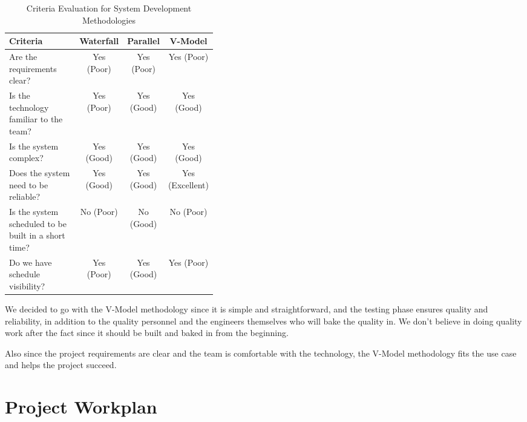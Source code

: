 \documentclass[a4paper]{report}
\begin{document}
\begin{table}[htbp]
    \centering
    \caption{Criteria Evaluation for System Development Methodologies}
    \label{tab:methodology-criteria}
    \begin{tabular}{@{}p{0.4\linewidth}ccc@{}}
        \toprule
        Criteria & Waterfall & Parallel & V-Model \\
        \midrule
        Are the requirements clear? & Yes (Poor) & Yes (Poor) & Yes (Poor) \\
        Is the technology familiar to the team? & Yes (Poor) & Yes (Good) & Yes (Good) \\
        Is the system complex? & Yes (Good) & Yes (Good) & Yes (Good) \\
        Does the system need to be reliable? & Yes (Good) & Yes (Good) & Yes (Excellent) \\
        Is the system scheduled to be built in a short time? & No (Poor) & No (Good) & No (Poor) \\
        Do we have schedule visibility? & Yes (Poor) & Yes (Good) & Yes (Poor) \\
        \bottomrule
    \end{tabular}
\end{table}

We decided to go with the V-Model methodology since it is simple and straightforward, and the testing phase ensures quality and reliability, in addition to the quality personnel and the engineers themselves who will bake the quality in. We don't believe in doing quality work after the fact since it should be built and baked in from the beginning.

Also since the project requirements are clear and the team is comfortable with the technology, the V-Model methodology fits the use case and helps the project succeed.

\chapter{Project Workplan}
\end{document}
